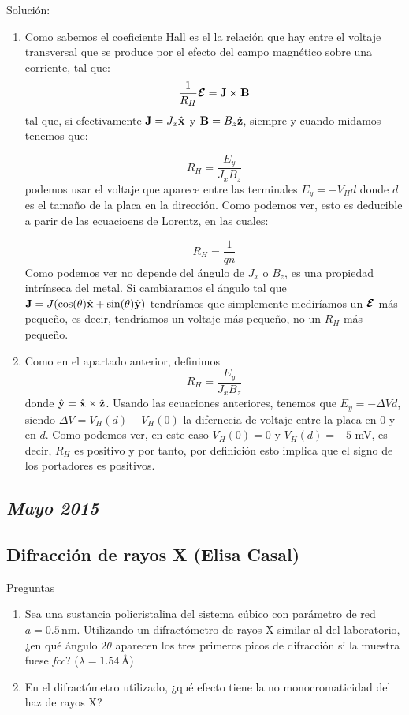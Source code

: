 Solución:

\begin{enumerate}[label=\alph*)]
	\item Como sabemos el coeficiente Hall es el la relación que hay entre el voltaje transversal que se produce por el efecto del campo magnético sobre una corriente, tal que:
	      \[
		      \frac{1}{R_H}\boldsymbol{\mathcal{E}}  = \mathbf{J} \times \mathbf{B}
	      \]
	      tal que, si efectivamente $\mathbf{J} = J_x \hat{\mathbf{x}} $ y $\mathbf{B} = B_z \hat{\mathbf{z}}$, siempre y cuando midamos  tenemos que:

	      \[
		      R_H = \frac{E_y}{J_x B_z}
	      \]
	      podemos usar el voltaje que aparece entre las terminales $E_y = - V_H d$ donde $d$ es el tamaño de la placa en la dirección. Como podemos ver, esto es deducible a parir de las ecuacioens de Lorentz, en las cuales:

	      \[
		      R_H = \frac{1}{qn}
	      \]
	      Como podemos ver no depende del ángulo de $J_x$ o $B_z$, es una propiedad intrínseca del metal. Si cambiaramos el ángulo tal que $\mathbf{J} = J (\cos (\theta) \hat{\mathbf{x}} + \sin (\theta) \hat{\mathbf{y}})$  tendríamos que simplemente mediríamos un $\boldsymbol{\mathcal{E}}$ más pequeño, es decir, tendríamos un voltaje más pequeño, no un $R_H$ más pequeño.


	\item Como en el apartado anterior, definimos
	      \[
		      R_H = \frac{E_y}{J_x B_z}
	      \]
	      donde $\hat{\mathbf{y}} = \hat{\mathbf{x}} \times \hat{\mathbf{z}}$. Usando las ecuaciones anteriores, tenemos que $E_y = - \Delta V d$, siendo $\Delta V = V_H(d)-V_H(0)$ la difernecia de voltaje entre la placa en $0$ y en $d$. Como podemos ver, en este caso $V_H(0)=0$ y $V_H(d)=-5$ mV, es decir, $R_H$ es positivo y por tanto, por definición esto implica que el signo de los portadores es positivos.


\end{enumerate}

\newpage

\subsection*{\textit{Mayo 2015}}

\begin{Enunciado}
	\subsection*{Difracción de rayos X (Elisa Casal)}
	Preguntas
	\begin{enumerate}[label=\alph*)]
	\item Sea una sustancia policristalina del sistema cúbico con parámetro de red \( a = 0.5\,\text{nm} \). Utilizando un difractómetro de rayos X similar al del laboratorio, ¿en qué ángulo \( 2\theta \) aparecen los tres primeros picos de difracción si la muestra fuese \textit{fcc}? (\( \lambda = 1.54\,\text{\AA} \))
	\item En el difractómetro utilizado, ¿qué efecto tiene la no monocromaticidad del haz de rayos X?
	\end{enumerate}
\end{Enunciado}

